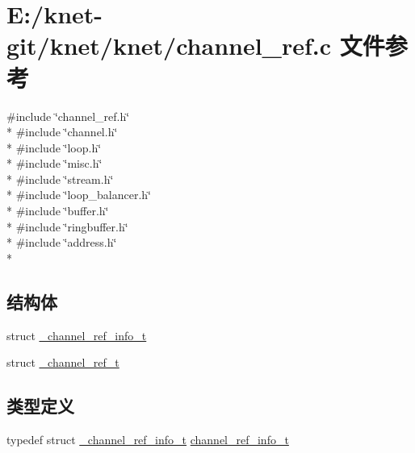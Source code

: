 \hypertarget{a00041}{}\section{E\+:/knet-\/git/knet/knet/channel\+\_\+ref.c 文件参考}
\label{a00041}
{\ttfamily \#include \char`\"{}channel\+\_\+ref.\+h\char`\"{}}\\*
{\ttfamily \#include \char`\"{}channel.\+h\char`\"{}}\\*
{\ttfamily \#include \char`\"{}loop.\+h\char`\"{}}\\*
{\ttfamily \#include \char`\"{}misc.\+h\char`\"{}}\\*
{\ttfamily \#include \char`\"{}stream.\+h\char`\"{}}\\*
{\ttfamily \#include \char`\"{}loop\+\_\+balancer.\+h\char`\"{}}\\*
{\ttfamily \#include \char`\"{}buffer.\+h\char`\"{}}\\*
{\ttfamily \#include \char`\"{}ringbuffer.\+h\char`\"{}}\\*
{\ttfamily \#include \char`\"{}address.\+h\char`\"{}}\\*
\subsection*{结构体}
\begin{DoxyCompactItemize}
\item 
struct \hyperlink{a00004}{\+\_\+channel\+\_\+ref\+\_\+info\+\_\+t}
\item 
struct \hyperlink{a00005}{\+\_\+channel\+\_\+ref\+\_\+t}
\end{DoxyCompactItemize}
\subsection*{类型定义}
\begin{DoxyCompactItemize}
\item 
typedef struct \hyperlink{a00004}{\+\_\+channel\+\_\+ref\+\_\+info\+\_\+t} \hyperlink{a00041_a3c8048d6abb647710be83f9b243c7822_a3c8048d6abb647710be83f9b243c7822}{channel\+\_\+ref\+\_\+info\+\_\+t}
\end{DoxyCompactItemize}
